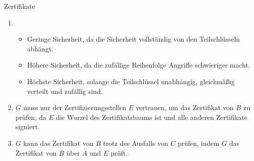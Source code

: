 \documentclass{article}
\begin{document}
\begin{exercise}{Zertifikate}
  \begin{solution}
    \begin{enumerate}
      \item
        \begin{itemize}
          \item Geringe Sicherheit, da die Sicherheit vollständig von den Teilschlüsseln abhängt.
          \item Höhere Sicherheit, da die zufällige Reihenfolge Angriffe schwieriger macht.
          \item Höchste Sicherheit, solange die Teilschlüssel unabhängig, gleichmäßig verteilt und zufällig sind.
        \end{itemize}
      \item $G$ muss nur der Zertifizierungsstellen $E$ vertrauen, um das Zertifikat von $B$ zu prüfen, da $E$ die Wurzel des Zertifikatsbaums ist und alle anderen Zertifikate signiert.
      \item $G$ kann das Zertifikat von $B$ trotz des Ausfalls von $C$ prüfen, indem $G$ das Zertifikat von $B$ über $A$ und $E$ prüft.
    \end{enumerate}
  \end{solution}
\end{exercise}
\end{document}
